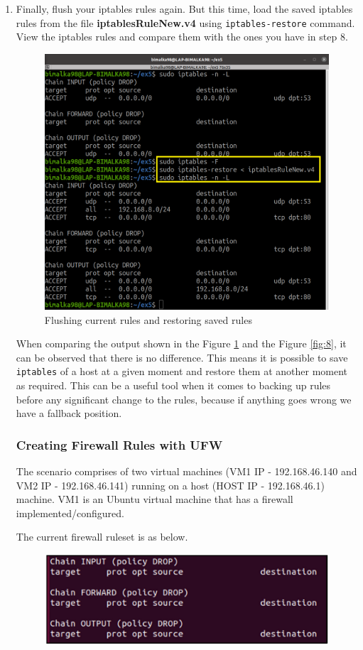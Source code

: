 \documentclass[11pt,letterpaper]{article}
\newenvironment{answer}{\em \color{blue} \begin{adjustwidth}{1cm}{1cm}}{\end{adjustwidth}}
\begin{document}
\begin{enumerate}
		\pagebreak
		\item Finally, flush your iptables rules again. But this time, load the saved iptables rules from the file \textbf{iptablesRuleNew.v4} using \texttt{iptables-restore} command. View the iptables rules and compare them with the ones you have in step 8.
		\begin{answer}
			\begin{figure}[H]
				\centering
				\includegraphics[width=0.65\columnwidth]{images/part1/11.png}
				\caption{Flushing current rules and restoring saved rules}
				\label{fig:11}
			\end{figure}
		
		When comparing the output shown in the Figure \ref{fig:11} and the Figure \ref{fig:8}, it can be observed that there is no difference. This means it is possible to save {\tt iptables} of a host at a given moment and restore them at another moment as required. This can be a useful tool when it comes to backing up rules before any significant change to the rules, because if anything goes wrong we have a fallback position.
		\end{answer}
		\pagebreak
		\subsubsection*{Creating Firewall Rules with UFW}
		
		The scenario comprises of two virtual machines (VM1 IP - 192.168.46.140 and VM2 IP - 192.168.46.141) running on a host (HOST IP - 192.168.46.1) machine. VM1 is an Ubuntu virtual machine that has a firewall implemented/configured. 
		
		The current firewall ruleset is as below.
		\begin{figure}[H]
			\centering
			\includegraphics[width=0.5\columnwidth]{images/ex5-firewall-rules.png}
		\end{figure}
		

\end{enumerate}
\end{document}
